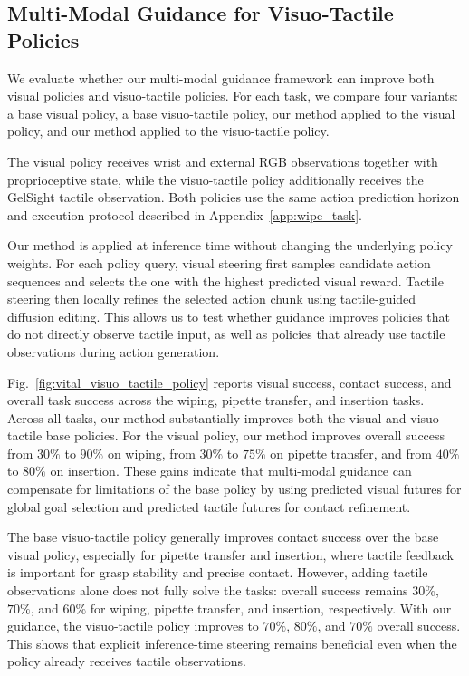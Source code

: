 \subsection{Multi-Modal Guidance for Visuo-Tactile Policies}
\label{app:visuo_tactile_policy}
We evaluate whether our multi-modal guidance framework can improve both visual policies and visuo-tactile policies. For each task, we compare four variants: a base visual policy, a base visuo-tactile policy, our method applied to the visual policy, and our method applied to the visuo-tactile policy.

 The visual policy receives wrist and external RGB observations together with proprioceptive state, while the visuo-tactile policy additionally receives the GelSight tactile observation. Both policies use the same action prediction horizon and execution protocol described in Appendix~\ref{app:wipe_task}. 

Our method is applied at inference time without changing the underlying policy weights. For each policy query, visual steering first samples candidate action sequences and selects the one with the highest predicted visual reward. Tactile steering then locally refines the selected action chunk using tactile-guided diffusion editing. This allows us to test whether guidance improves policies that do not directly observe tactile input, as well as policies that already use tactile observations during action generation.

Fig.~\ref{fig:vital_visuo_tactile_policy} reports visual success, contact success, and overall task success across the wiping, pipette transfer, and insertion tasks. Across all tasks, our method substantially improves both the visual and visuo-tactile base policies. For the visual policy, our method improves overall success from $30\%$ to $90\%$ on wiping, from $30\%$ to $75\%$ on pipette transfer, and from $40\%$ to $80\%$ on insertion. These gains indicate that multi-modal guidance can compensate for limitations of the base policy by using predicted visual futures for global goal selection and predicted tactile futures for contact refinement.

The base visuo-tactile policy generally improves contact success over the base visual policy, especially for pipette transfer and insertion, where tactile feedback is important for grasp stability and precise contact. However, adding tactile observations alone does not fully solve the tasks: overall success remains $30\%$, $70\%$, and $60\%$ for wiping, pipette transfer, and insertion, respectively. With our guidance, the visuo-tactile policy improves to $70\%$, $80\%$, and $70\%$ overall success. This shows that explicit inference-time steering remains beneficial even when the policy already receives tactile observations.

